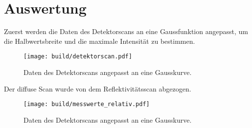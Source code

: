\section{Auswertung}
\label{sec:Auswertung}

Zuerst werden die Daten des Detektorscans an eine Gaussfunktion angepasst, um die Halbwertsbreite und die maximale Intensität zu bestimmen.

\begin{figure}[H]
    \centering
    \texttt{[image: build/detektorscan.pdf]}
    \caption{Daten des Detektorscans angepasst an eine Gausskurve.}
    \label{fig:detektor}
  \end{figure}

Der diffuse Scan wurde von dem Reflektivitätsscan abgezogen.
  \begin{figure}[H]
    \centering
    \texttt{[image: build/messwerte\_relativ.pdf]}
    \caption{Daten des Detektorscans angepasst an eine Gausskurve.}
    \label{fig:messwerte_relativ}
  \end{figure}